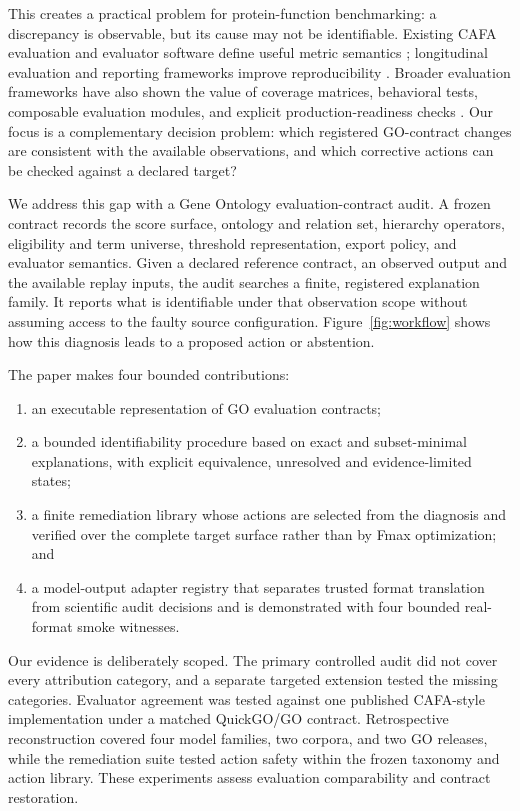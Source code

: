 \documentclass[11pt]{article}
\begin{document}
This creates a practical problem for protein-function benchmarking: a discrepancy is observable, but its cause may not be identifiable. Existing CAFA evaluation and evaluator software define useful metric semantics \citep{radivojac2013cafa,jiang2016cafa,zhou2019cafa,piovesan2024cafaevaluator}; longitudinal evaluation and reporting frameworks improve reproducibility \citep{phan2026lafa,walsh2021dome,attafi2024domeregistry,garciavinuesa2026benchmarking}. Broader evaluation frameworks have also shown the value of coverage matrices, behavioral tests, composable evaluation modules, and explicit production-readiness checks \citep{liang2022helm,ribeiro2020checklist,goel2021robustnessgym,breck2017mltestscore}. Our focus is a complementary decision problem: which registered GO-contract changes are consistent with the available observations, and which corrective actions can be checked against a declared target?

We address this gap with a Gene Ontology evaluation-contract audit. A frozen contract records the score surface, ontology and relation set, hierarchy operators, eligibility and term universe, threshold representation, export policy, and evaluator semantics. Given a declared reference contract, an observed output and the available replay inputs, the audit searches a finite, registered explanation family. It reports what is identifiable under that observation scope without assuming access to the faulty source configuration. Figure~\ref{fig:workflow} shows how this diagnosis leads to a proposed action or abstention.

The paper makes four bounded contributions:
\begin{enumerate}[leftmargin=*]
\item an executable representation of GO evaluation contracts;
\item a bounded identifiability procedure based on exact and subset-minimal explanations, with explicit equivalence, unresolved and evidence-limited states;
\item a finite remediation library whose actions are selected from the diagnosis and verified over the complete target surface rather than by Fmax optimization; and
\item a model-output adapter registry that separates trusted format translation from scientific audit decisions and is demonstrated with four bounded real-format smoke witnesses.
\end{enumerate}

Our evidence is deliberately scoped. The primary controlled audit did not cover every attribution category, and a separate targeted extension tested the missing categories. Evaluator agreement was tested against one published CAFA-style implementation under a matched QuickGO/GO contract. Retrospective reconstruction covered four model families, two corpora, and two GO releases, while the remediation suite tested action safety within the frozen taxonomy and action library. These experiments assess evaluation comparability and contract restoration.
\end{document}
